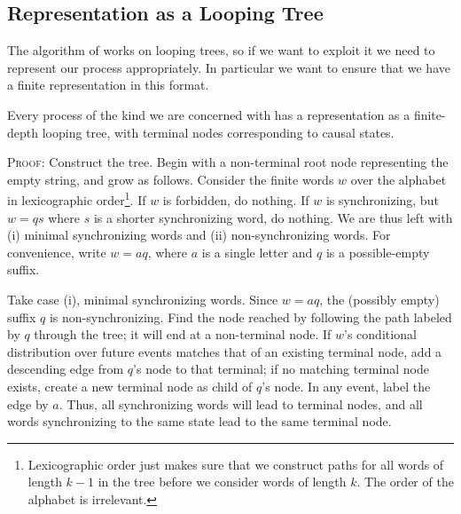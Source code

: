 \documentclass[../new-procedure.tex]{subfiles}
\begin{document}
\subsection{Representation as a Looping Tree}

The algorithm of \cite{Holmes-Isbell-looping} works on looping trees, so if we
want to exploit it we need to represent our process appropriately.  In
particular we want to ensure that we have a finite representation in this
format.

\begin{proposition}
  Every process of the kind we are concerned with has a representation as a
  finite-depth looping tree, with terminal nodes corresponding to causal
  states.
\end{proposition}

\textsc{Proof:} Construct the tree.  Begin with a non-terminal root node
representing the empty string, and grow as follows.  Consider the finite words
$w$ over the alphabet in lexicographic order\footnote{Lexicographic order just
  makes sure that we construct paths for all words of length $k-1$ in the tree
  before we consider words of length $k$.  The order of the alphabet is
  irrelevant.}.  If $w$ is forbidden, do nothing.  If $w$ is synchronizing, but
$w=qs$ where $s$ is a shorter synchronizing word, do nothing.  We are thus left
with (i) minimal synchronizing words and (ii) non-synchronizing words.  For
convenience, write $w=aq$, where $a$ is a single letter and $q$ is a
possible-empty suffix.

Take case (i), minimal synchronizing words.  Since $w = aq$, the (possibly
empty) suffix $q$ is non-synchronizing.  Find the node reached by following the
path labeled by $q$ through the tree; it will end at a non-terminal node.  If
$w$'s conditional distribution over future events matches that of an existing
terminal node, add a descending edge from $q$'s node to that terminal; if no
matching terminal node exists, create a new terminal node as child of $q$'s
node.  In any event, label the edge by $a$. Thus, all synchronizing words will
lead to terminal nodes, and all words synchronizing to the same state lead to
the same terminal node.
\end{document}
